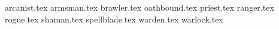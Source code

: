 {arcanist.tex}
\clearpage
{armsman.tex}
\clearpage
{brawler.tex}
\clearpage
{oathbound.tex}
\clearpage
{priest.tex}
\clearpage
{ranger.tex}
\clearpage
{rogue.tex}
\clearpage
{shaman.tex}
\clearpage
{spellblade.tex}
\clearpage
{warden.tex}
\clearpage
{warlock.tex}
